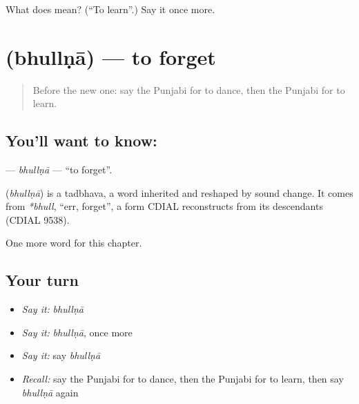 \begin{tcolorbox}[breakable,colback=teal!4,colframe=teal!35!black,title={Before you move on}]
What does  mean? (\textquotedblleft{}To learn\textquotedblright{}.) Say it once more.
\end{tcolorbox}
\section[\texorpdfstring{\pa{ਭੁੱਲਣਾ} (bhullṇā)}{ਭੁੱਲਣਾ (bhullṇā)}]{ (bhullṇā) — to forget}

\label{lesson:PA-C60-bhullna}



\begin{quote}
Before the new one: say the Punjabi for to dance, then the Punjabi for to learn.
\end{quote}

\subsection*{You'll want to know: }
\textbf{} — \emph{bhullṇā} — \textquotedblleft{}to forget\textquotedblright{}.

\begin{cousinweb}
\textbf{} (\emph{bhullṇā}) is a tadbhava, a word inherited and reshaped by sound change. It comes from \emph{*bhull}, \textquotedblleft{}err, forget\textquotedblright{}, a form CDIAL reconstructs from its descendants (CDIAL 9538).
\end{cousinweb}

\begin{grammarlens}[title={What you've built}]
One more word for this chapter.
\end{grammarlens}

\subsection*{Your turn}
\begin{itemize}
\raggedright
  \item \emph{Say it:} \emph{bhullṇā}
  \item \emph{Say it:} \emph{bhullṇā}, once more
  \item \emph{Say it:} say \emph{bhullṇā}
  \item \emph{Recall:} say the Punjabi for to dance, then the Punjabi for to learn, then say \emph{bhullṇā} again
\end{itemize}

